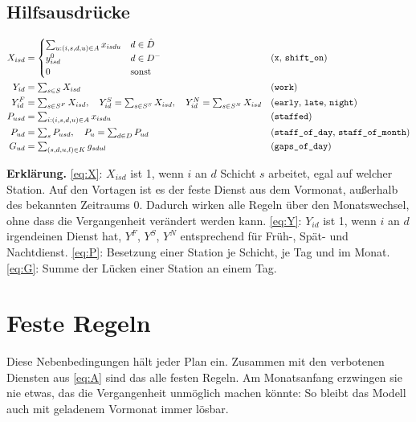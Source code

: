 \documentclass[11pt]{combiArticle}
\newcommand{\Dm}{D^{-}}
\newcommand{\code}[1]{\texttt{#1}}
\begin{document}
\subsection{Hilfsausdrücke}

\begin{align}
  X_{isd} &= \begin{cases}
      \sum_{u : (i,s,d,u) \in A} x_{isdu} & d \in \hat D\\
      y^{0}_{isd} & d \in \Dm\\
      0 & \text{sonst}
    \end{cases} && \text{(\code{x}, \code{shift\_on})} \label{eq:X}\\
  Y_{id} &= \textstyle\sum_{s \in S} X_{isd} && \text{(\code{work})} \label{eq:Y}\\
  Y^{F}_{id} &= \textstyle\sum_{s \in S^{F}} X_{isd},\quad
  Y^{S}_{id} = \sum_{s \in S^{S}} X_{isd},\quad
  Y^{N}_{id} = \sum_{s \in S^{N}} X_{isd} && \text{(\code{early}, \code{late}, \code{night})} \notag\\
  P_{usd} &= \textstyle\sum_{i : (i,s,d,u) \in A} x_{isdu} && \text{(\code{staffed})} \label{eq:P}\\
  P_{ud} &= \textstyle\sum_{s} P_{usd},\quad
  P_{u} = \sum_{d \in D} P_{ud} && \text{(\code{staff\_of\_day}, \code{staff\_of\_month})} \notag\\
  G_{ud} &= \textstyle\sum_{(s,d,u,l) \in K} g_{sdul} && \text{(\code{gaps\_of\_day})} \label{eq:G}
\end{align}

\textbf{Erklärung.}
\eqref{eq:X}: $X_{isd}$ ist 1, wenn $i$ an $d$ Schicht $s$ arbeitet, egal auf welcher Station. Auf den
Vortagen ist es der feste Dienst aus dem Vormonat, außerhalb des bekannten Zeitraums 0. Dadurch wirken alle
Regeln über den Monatswechsel, ohne dass die Vergangenheit verändert werden kann.
\eqref{eq:Y}: $Y_{id}$ ist 1, wenn $i$ an $d$ irgendeinen Dienst hat, $Y^{F}$, $Y^{S}$, $Y^{N}$ entsprechend
für Früh-, Spät- und Nachtdienst.
\eqref{eq:P}: Besetzung einer Station je Schicht, je Tag und im Monat.
\eqref{eq:G}: Summe der Lücken einer Station an einem Tag.

\section{Feste Regeln}\label{sec:regeln}

Diese Nebenbedingungen hält jeder Plan ein. Zusammen mit den verbotenen Diensten aus \eqref{eq:A} sind das alle
festen Regeln. Am Monatsanfang erzwingen sie nie etwas, das die Vergangenheit unmöglich machen könnte: So bleibt
das Modell auch mit geladenem Vormonat immer lösbar.
\end{document}
